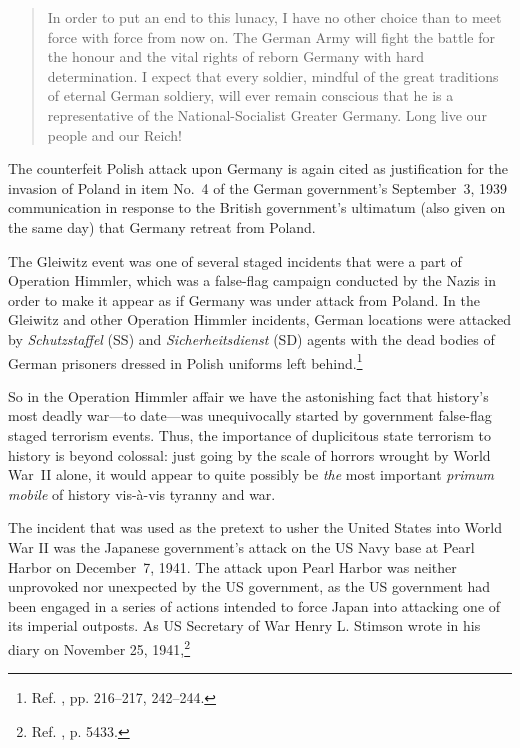 \documentclass[letterpaper,12pt]{article}
\makeatletter
\newcommand{\asterism}{\smash{%
  \raisebox{-.5ex}{%
    \setlength{\tabcolsep}{-.5pt}%
    \begin{tabular}{@{}cc@{}}%
      \multicolumn2c*\\[-2ex]*&*%
    \end{tabular}}}}
\makeatother
\begin{document}
{\begin{quotation}
In order to put an end to this lunacy, I have no other choice than to meet force with force from now on. The German Army will fight the battle for the honour and the vital rights of reborn Germany with hard determination. I expect that every soldier, mindful of the great traditions of eternal German soldiery, will ever remain conscious that he is a representative of the National-Socialist Greater Germany. Long live our people and our Reich!
\end{quotation}\par
    The counterfeit Polish attack upon Germany is again cited as justification for the invasion of Poland in item No.~4 of the German government's September~3, 1939 communication \cite{YaleLawSchool1939-09-03} in response to the British government's ultimatum (also given on the same day) that Germany retreat from Poland.} The Gleiwitz event was one of several staged incidents that were a part of Operation Himmler, which was a false-flag campaign conducted by the Nazis in order to make it appear as if Germany was under attack from Poland. In the Gleiwitz and other Operation Himmler incidents, German locations were attacked by \emph{Schutzstaffel} (SS) and \emph{Sicherheitsdienst} (SD) agents with the dead bodies of German prisoners dressed in Polish uniforms left behind.\footnote{Ref. , pp. 216--217, 242--244.}

So in the Operation Himmler affair we have the astonishing fact that history's most deadly war---to date---was unequivocally started by government false-flag staged terrorism events. Thus, the importance of duplicitous state terrorism to history is beyond colossal: just going by the scale of horrors wrought by World War~II alone, it would appear to quite possibly be \emph{the} most important \emph{primum mobile} of history vis-\`{a}-vis tyranny and war.

\vspace{1em}
\centerline{\asterism}
\vspace{1em}

The incident that was used as the pretext to usher the United States into World War II was the Japanese government's attack on the US Navy base at Pearl Harbor on December~7, 1941. The attack upon Pearl Harbor was neither unprovoked nor unexpected by the US government, as the US government had been engaged in a series of actions intended to force Japan into attacking one of its imperial outposts. As US Secretary of War Henry L. Stimson wrote in his diary on November 25, 1941,\footnote{Ref. , p. 5433.}
\end{document}
